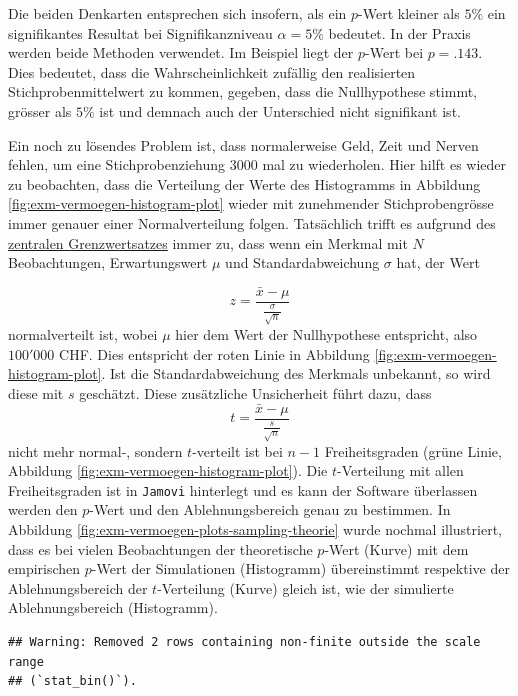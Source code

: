 \documentclass[
]{book}
\theoremstyle{definition}
\theoremstyle{definition}
\theoremstyle{definition}
\theoremstyle{definition}
\theoremstyle{remark}
\begin{document}
Die beiden Denkarten entsprechen sich insofern, als ein \(p\)-Wert kleiner als \(5\%\) ein signifikantes Resultat bei Signifikanzniveau \(\alpha = 5\%\) bedeutet. In der Praxis werden beide Methoden verwendet. Im Beispiel liegt der \(p\)-Wert bei \(p = .143\). Dies bedeutet, dass die Wahrscheinlichkeit zufällig den realisierten Stichprobenmittelwert zu kommen, gegeben, dass die Nullhypothese stimmt, grösser als \(5\%\) ist und demnach auch der Unterschied nicht signifikant ist.

Ein noch zu lösendes Problem ist, dass normalerweise Geld, Zeit und Nerven fehlen, um eine Stichprobenziehung \(3000\) mal zu wiederholen. Hier hilft es wieder zu beobachten, dass die Verteilung der Werte des Histogramms in Abbildung \ref{fig:exm-vermoegen-histogram-plot} wieder mit zunehmender Stichprobengrösse immer genauer einer Normalverteilung folgen. Tatsächlich trifft es aufgrund des \hyperref[customdef-zentraler-grenzwertsatz]{zentralen Grenzwertsatzes} immer zu, dass wenn ein Merkmal mit \(N\) Beobachtungen, Erwartungswert \(\mu\) und Standardabweichung \(\sigma\) hat, der Wert

\[z = \frac{\bar{x}-\mu}{\frac{\sigma}{\sqrt{n}}}\]
normalverteilt ist, wobei \(\mu\) hier dem Wert der Nullhypothese entspricht, also \(100'000\) CHF. Dies entspricht der roten Linie in Abbildung \ref{fig:exm-vermoegen-histogram-plot}. Ist die Standardabweichung des Merkmals unbekannt, so wird diese mit \(s\) geschätzt. Diese zusätzliche Unsicherheit führt dazu, dass
\begin{equation}
t = \frac{\bar{x}-\mu}{\frac{s}{\sqrt{n}}}
\label{eq:t-emp-onesample}
\end{equation}
nicht mehr normal-, sondern \(t\)-verteilt ist bei \(n-1\) Freiheitsgraden (grüne Linie, Abbildung \ref{fig:exm-vermoegen-histogram-plot}). Die \(t\)-Verteilung mit allen Freiheitsgraden ist in \texttt{Jamovi} hinterlegt und es kann der Software überlassen werden den \(p\)-Wert und den Ablehnungsbereich genau zu bestimmen. In Abbildung \ref{fig:exm-vermoegen-plots-sampling-theorie} wurde nochmal illustriert, dass es bei vielen Beobachtungen der theoretische \(p\)-Wert (Kurve) mit dem empirischen \(p\)-Wert der Simulationen (Histogramm) übereinstimmt respektive der Ablehnungsbereich der \(t\)-Verteilung (Kurve) gleich ist, wie der simulierte Ablehnungsbereich (Histogramm).

\begin{verbatim}
## Warning: Removed 2 rows containing non-finite outside the scale range
## (`stat_bin()`).
\end{verbatim}
\end{document}
